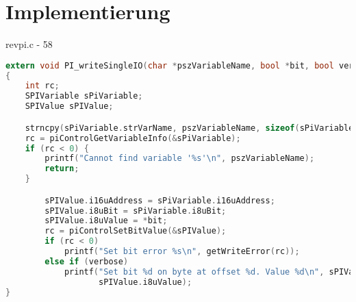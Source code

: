 % 
% 
% 
% 
% 
% 
% 
% 

\section{Implementierung%
  \label{sec:4-implementierung}}

revpi.c - 58

\begin{lstlisting}[language={c},firstnumber=97,caption={Setzen eines phsikalischen, digitalen Ausgangs\label{lst:4-PI_writeSingleIO}}]
extern void PI_writeSingleIO(char *pszVariableName, bool *bit, bool verbose)
{
	int rc;
	SPIVariable sPiVariable;
	SPIValue sPIValue;

	strncpy(sPiVariable.strVarName, pszVariableName, sizeof(sPiVariable.strVarName));
	rc = piControlGetVariableInfo(&sPiVariable);
	if (rc < 0) {
		printf("Cannot find variable '%s'\n", pszVariableName);
		return;
	}

		sPIValue.i16uAddress = sPiVariable.i16uAddress;
		sPIValue.i8uBit = sPiVariable.i8uBit;
		sPIValue.i8uValue = *bit;
		rc = piControlSetBitValue(&sPIValue);
		if (rc < 0)
			printf("Set bit error %s\n", getWriteError(rc));
		else if (verbose)
			printf("Set bit %d on byte at offset %d. Value %d\n", sPIValue.i8uBit, sPIValue.i16uAddress,
			       sPIValue.i8uValue);
}
\end{lstlisting}

